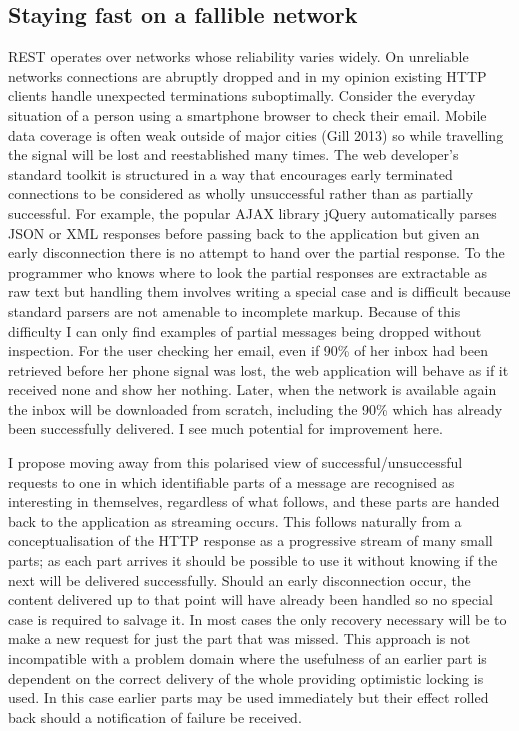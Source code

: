 \documentclass[12pt, ]{article}
\begin{document}
\subsection{Staying fast on a fallible
network}\label{staying-fast-on-a-fallible-network}

REST operates over networks whose reliability varies widely. On
unreliable networks connections are abruptly dropped and in my opinion
existing HTTP clients handle unexpected terminations suboptimally.
Consider the everyday situation of a person using a smartphone browser
to check their email. Mobile data coverage is often weak outside of
major cities (Gill 2013) so while travelling the signal will be lost and
reestablished many times. The web developer's standard toolkit is
structured in a way that encourages early terminated connections to be
considered as wholly unsuccessful rather than as partially successful.
For example, the popular AJAX library jQuery automatically parses JSON
or XML responses before passing back to the application but given an
early disconnection there is no attempt to hand over the partial
response. To the programmer who knows where to look the partial
responses are extractable as raw text but handling them involves writing
a special case and is difficult because standard parsers are not
amenable to incomplete markup. Because of this difficulty I can only
find examples of partial messages being dropped without inspection. For
the user checking her email, even if 90\% of her inbox had been
retrieved before her phone signal was lost, the web application will
behave as if it received none and show her nothing. Later, when the
network is available again the inbox will be downloaded from scratch,
including the 90\% which has already been successfully delivered. I see
much potential for improvement here.

I propose moving away from this polarised view of
successful/unsuccessful requests to one in which identifiable parts of a
message are recognised as interesting in themselves, regardless of what
follows, and these parts are handed back to the application as streaming
occurs. This follows naturally from a conceptualisation of the HTTP
response as a progressive stream of many small parts; as each part
arrives it should be possible to use it without knowing if the next will
be delivered successfully. Should an early disconnection occur, the
content delivered up to that point will have already been handled so no
special case is required to salvage it. In most cases the only recovery
necessary will be to make a new request for just the part that was
missed. This approach is not incompatible with a problem domain where
the usefulness of an earlier part is dependent on the correct delivery
of the whole providing optimistic locking is used. In this case earlier
parts may be used immediately but their effect rolled back should a
notification of failure be received.
\end{document}

